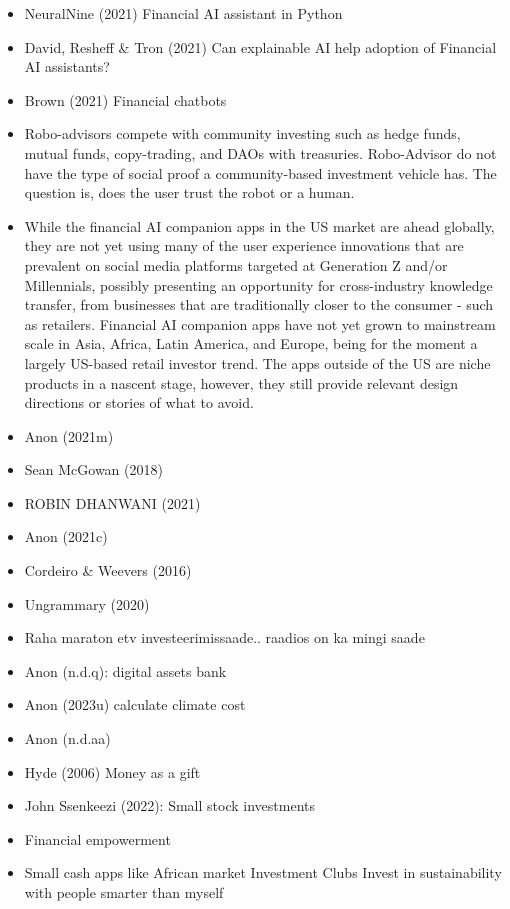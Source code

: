 \documentclass[
  letterpaper,
  DIV=11,
  numbers=noendperiod]{scrartcl}
\begin{document}
\begin{itemize}
\item
  NeuralNine (2021) Financial AI assistant in Python
\item
  David, Resheff \& Tron (2021) Can explainable AI help adoption of
  Financial AI assistants?
\item
  Brown (2021) Financial chatbots
\item
  Robo-advisors compete with community investing such as hedge funds,
  mutual funds, copy-trading, and DAOs with treasuries. Robo-Advisor do
  not have the type of social proof a community-based investment vehicle
  has. The question is, does the user trust the robot or a human.
\item
  While the financial AI companion apps in the US market are ahead
  globally, they are not yet using many of the user experience
  innovations that are prevalent on social media platforms targeted at
  Generation Z and/or Millennials, possibly presenting an opportunity
  for cross-industry knowledge transfer, from businesses that are
  traditionally closer to the consumer - such as retailers. Financial AI
  companion apps have not yet grown to mainstream scale in Asia, Africa,
  Latin America, and Europe, being for the moment a largely US-based
  retail investor trend. The apps outside of the US are niche products
  in a nascent stage, however, they still provide relevant design
  directions or stories of what to avoid.
\item
  Anon (2021m)
\item
  Sean McGowan (2018)
\item
  ROBIN DHANWANI (2021)
\item
  Anon (2021c)
\item
  Cordeiro \& Weevers (2016)
\item
  Ungrammary (2020)
\item
  Raha maraton etv investeerimissaade.. raadios on ka mingi saade
\item
  Anon (n.d.q): digital assets bank
\item
  Anon (2023u) calculate climate cost
\item
  Anon (n.d.aa)
\item
  Hyde (2006) Money as a gift
\item
  John Ssenkeezi (2022): Small stock investments
\item
  Financial empowerment
\item
  Small cash apps like African market Investment Clubs Invest in
  sustainability with people smarter than myself

\end{itemize}
\end{document}
